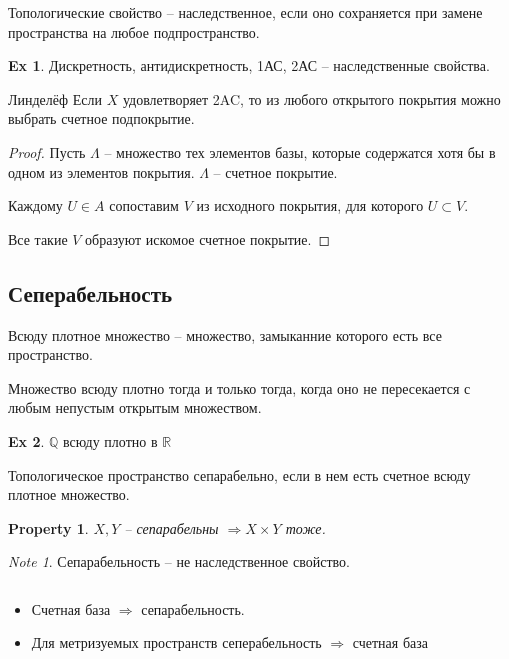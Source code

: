 \documentclass[11pt]{book}
\newcommand{\R}{\mathbb{R}}
\newcommand{\Q}{\mathbb{Q}}
\theoremstyle{definition}
\theoremstyle{plain}
\theoremstyle{plain}
\newtheorem*{prop}{Property}
\theoremstyle{definition}
\newtheorem*{ex}{Ex}
\theoremstyle{remark}
\newtheorem*{note}{Note}
\begin{document}
\begin{defn}
    Топологические свойство -- наследственное, если оно сохраняется при замене пространства на любое подпространство.
\end{defn}
\begin{ex}
    Дискретность, антидискретность, 1АС, 2АС -- наследственные свойства.
\end{ex}
\begin{thm}{Линделёф}
    Если $ X$ удовлетворяет 2AC, то из любого открытого покрытия можно выбрать счетное подпокрытие.
\end{thm}
\begin{proof}
    Пусть  $ \Lambda $ -- множество тех элементов базы, которые содержатся хотя бы в одном из элементов покрытия. $ \Lambda$ -- счетное покрытие.

    Каждому $ U \in A$ сопоставим $ V$ из исходного покрытия, для которого  $ U \subset V$.

    Все такие $ V$ образуют искомое счетное покрытие.
\end{proof}
\subsection{Сеперабельность}
\begin{defn}
    Всюду плотное множество -- множество, замыканние которого есть все пространство.
\end{defn}
\begin{defn}
    Множество всюду плотно тогда и только тогда, когда оно не пересекается с любым непустым открытым множеством.
\end{defn}
\begin{ex}
    $ \Q$ всюду плотно в $ \R$
\end{ex}
\begin{defn}
    Топологическое пространство сепарабельно, если в нем есть счетное всюду плотное множество.
\end{defn}
\begin{prop}
    $ X, Y$ -- сепарабельны $ \Longrightarrow  X \times Y$  тоже.
\end{prop}
\begin{note}
    Сепарабельность -- не наследственное свойство.
\end{note}
\begin{thm}$ $
    \begin{itemize}
	\item Счетная база $ \Longrightarrow  $ сепарабельность.
	\item Для метризуемых пространств сеперабельность $\Longrightarrow$ счетная база
    \end{itemize}
\end{thm}
\end{document}
